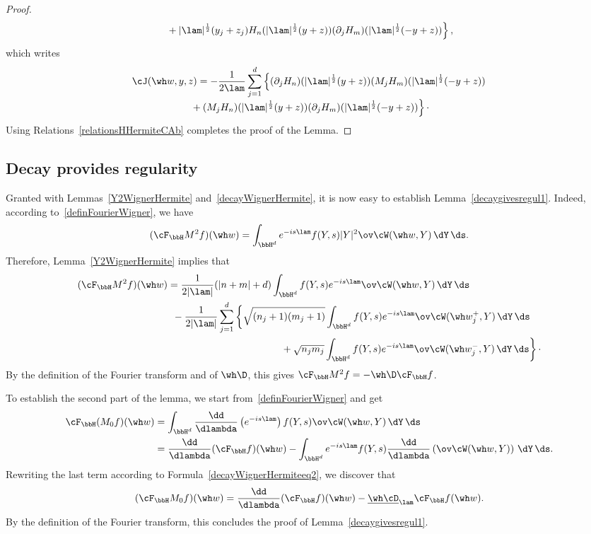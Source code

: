 \begin{proof}
\begin{multline*}
\left.{} + |\lam|^{\frac 12} (y_j+z_j)H_n (|\lam|^{\frac 12} (y+z)) (\partial_j H_m)(|\lam|^{\frac 12} (-y+z))\right\},
\end{multline*}
which writes
\begin{multline*}
\cJ(\wh w,y,z) = - \frac {1 }{2\lam} \sum_{j=1}^d \left\{ (\partial_j H_n) (|\lam|^{\frac 12} (y+z))(M_jH_m)(|\lam|^{\frac 12} (-y+z)) \right.\\[-0.3em]
\left.{} + (M_jH_n)(|\lam|^{\frac 12} (y+z)) (\partial_j H_m)(|\lam|^{\frac 12} (-y+z))\right\}\cdotp
\end{multline*}
Using Relations~\eqref{relationsHHermiteCAb} completes the proof of the Lemma.
\end{proof}

\subsection{Decay provides regularity} \label{Regularity}

Granted with Lemmas~\ref{Y2WignerHermite} and~\ref{decayWignerHermite}, it is now easy to establish Lemma~\ref{decaygivesregul1}. Indeed, according to~\eqref{definFourierWigner}, we have
\[
(\cF_\bbH M^2f)(\wh w) = \int_{\bbH^d} e^{-is\lam} f(Y,s) |Y|^2 \ov\cW(\wh w,Y) \,\dY\,\ds.
\]
Therefore, Lemma~\ref{Y2WignerHermite} implies that
\begin{align*}
(\cF_\bbH M^2f)(\wh w) = \frac 1{2|\lam|} (|n+m| +d) \int_{\bbH^d} f(Y,s)e^{-is\lam} \ov\cW(\wh w,Y)\,\dY\,\ds\mkern 130mu\\ 
{}-\frac 1 {2|\lam|} \sum_{j=1} ^d \left\{ \sqrt {(n_j+1) (m_j+1)} \int_{\bbH^d} f(Y,s) e^{-is\lam} \ov\cW(\wh w_j^+,Y)\,\dY\,\ds \right.\quad \\
\left.{}+\sqrt {n_jm_j} \int_{\bbH^d} f(Y,s) e^{-is\lam} \ov\cW(\wh w_j^-, Y) \,\dY\,\ds \right\}\cdotp
\end{align*}
By the definition of the Fourier transform and of $\wh\D$, this gives $\cF_{\bbH} M^2 f= -\wh \D\cF_\bbH f$.

To establish the second part of the lemma, we start from~\eqref{definFourierWigner} and get
\begin{align*}
\cF_\bbH(M_0 f)(\wh w) & = \int_{\bbH^d} \frac{\dd}{\dlambda} \left(e^{-is\lam} \right) f(Y,s) \ov\cW(\wh w,Y) \,\dY\,\ds\\
& = \frac{\dd}{\dlambda} (\cF_\bbH f)(\wh w) - \int_{\bbH^d} e^{-is\lam} f(Y,s) \frac{\dd}{\dlambda} \left(\ov\cW(\wh w,Y) \right) \,\dY\,\ds.
\end{align*}
Rewriting the last term according to Formula~\eqref{decayWignerHermiteeq2}, we discover that
\[
(\cF_\bbH M_0f)(\wh w) = \frac{\dd}{\dlambda} (\cF_\bbH f)(\wh w) -\underline{\wh\cD}_\lam\cF_\bbH f(\wh w).
\]
By the definition of the Fourier transform, this concludes the proof of Lemma~\ref{decaygivesregul1}.

